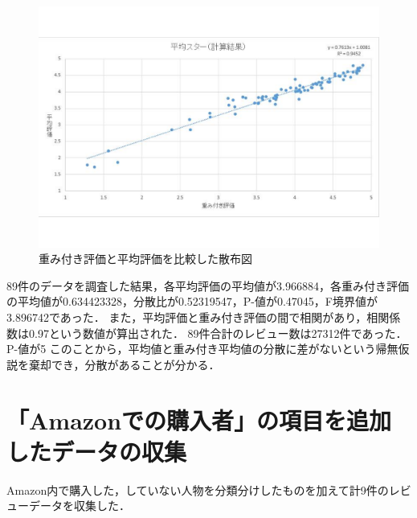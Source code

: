 \begin{figure}[htbp]

\centering
\includegraphics[width=12cm,clip]{sanpuzu.pdf}
\caption{重み付き評価と平均評価を比較した散布図}
\label{sanpuzu}

\end{figure}





89件のデータを調査した結果，各平均評価の平均値が3.966884，各重み付き評価の平均値が0.634423328，分散比が0.52319547，P-値が0.47045，F境界値が3.896742であった．
また，平均評価と重み付き評価の間で相関があり，相関係数は0.97という数値が算出された．
89件合計のレビュー数は27312件であった．
P-値が5%
このことから，平均値と重み付き平均値の分散に差がないという帰無仮説を棄却でき，分散があることが分かる．

\clearpage

\section{「Amazonでの購入者」の項目を追加したデータの収集}


Amazon内で購入した，していない人物を分類分けしたものを加えて計9件のレビューデータを収集した．


